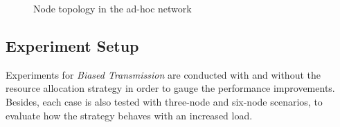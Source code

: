 \documentclass[journal]{IEEEtran}  %
\begin{document}
\begin{figure}[htpb]
\begin{center}
\caption{Node topology in the ad-hoc network}
\label{fig:topology}
\end{center}
\end{figure}



\subsection{Experiment Setup}
Experiments for 
\textit{Biased Transmission} are conducted with and without the resource
allocation strategy in order to gauge the performance improvements. 
Besides, each case is also tested with three-node and six-node scenarios, to
evaluate how the strategy behaves with an increased load.
\end{document}
